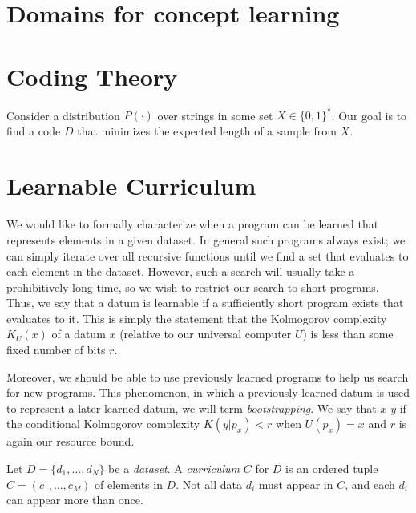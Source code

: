 \documentclass{article}
\begin{document}
\section{Domains for concept learning}

\section{Coding Theory}
Consider a distribution $P(\cdot)$ over strings in some set $X \in
\{0, 1\}^*$. Our goal is to find a code $D$ that minimizes the
expected length of a sample from $X$.

\section{Learnable Curriculum}
We would like to formally characterize when a program can be learned
that represents elements in a given dataset. In general such programs
always exist; we can simply iterate over all recursive functions until
we find a set that evaluates to each element in the dataset. However,
such a search will usually take a prohibitively long time, so we wish
to restrict our search to short programs.  Thus, we say that a datum
is learnable if a sufficiently short program exists that evaluates to
it. This is simply the statement that the Kolmogorov complexity
$K_U(x)$ of a datum $x$ (relative to our universal computer $U$) is
less than some fixed number of bits $r$. 

Moreover, we should be able to use previously learned programs to help
us search for new programs. This phenomenon, in which a previously
learned datum is used to represent a later learned datum, we will term
\emph{bootstrapping}. We say that $x$  $y$ if the
conditional Kolmogorov complexity $K(y|p_x) < r$ when $U(p_x) = x$ and
$r$ is again our resource bound. 

Let $D= \{d_1, \dots, d_N\}$ be a \emph{dataset}. A \emph{curriculum}
$C$ for $D$ is an ordered tuple $C = (c_1, \dots, c_M)$ of elements in
$D$. Not all data $d_i$ must appear in $C$, and each $d_i$ can appear
more than once.
\end{document}

